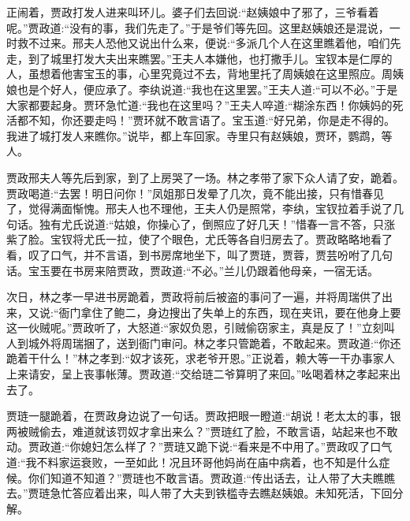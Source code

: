\begin{parag}
    正闹着，贾政打发人进来叫环儿。婆子们去回说:“赵姨娘中了邪了，三爷看着呢。”贾政道:“没有的事，我们先走了。”于是爷们等先回。这里赵姨娘还是混说，一时救不过来。邢夫人恐他又说出什么来，便说:“多派几个人在这里瞧着他，咱们先走，到了城里打发大夫出来瞧罢。”王夫人本嫌他，也打撒手儿。宝钗本是仁厚的人，虽想着他害宝玉的事，心里究竟过不去，背地里托了周姨娘在这里照应。周姨娘也是个好人，便应承了。李纨说道:“我也在这里罢。”王夫人道:“可以不必。”于是大家都要起身。贾环急忙道:“我也在这里吗？”王夫人啐道:“糊涂东西！你姨妈的死活都不知，你还要走吗！”贾环就不敢言语了。宝玉道:“好兄弟，你是走不得的。我进了城打发人来瞧你。”说毕，都上车回家。寺里只有赵姨娘，贾环，鹦鹉，等人。
\end{parag}


\begin{parag}
    贾政邢夫人等先后到家，到了上房哭了一场。林之孝带了家下众人请了安，跪着。贾政喝道:“去罢！明日问你！”凤姐那日发晕了几次，竟不能出接，只有惜春见了，觉得满面惭愧。邢夫人也不理他，王夫人仍是照常，李纨，宝钗拉着手说了几句话。独有尤氏说道:“姑娘，你操心了，倒照应了好几天！”惜春一言不答，只涨紫了脸。宝钗将尤氏一拉，使了个眼色，尤氏等各自归房去了。贾政略略地看了看，叹了口气，并不言语，到书房席地坐下，叫了贾琏，贾蓉，贾芸吩咐了几句话。宝玉要在书房来陪贾政，贾政道:“不必。”兰儿仍跟着他母亲，一宿无话。
\end{parag}


\begin{parag}
    次日，林之孝一早进书房跪着，贾政将前后被盗的事问了一遍，并将周瑞供了出来，又说:“衙门拿住了鲍二，身边搜出了失单上的东西，现在夹讯，要在他身上要这一伙贼呢。”贾政听了，大怒道:“家奴负恩，引贼偷窃家主，真是反了！”立刻叫人到城外将周瑞捆了，送到衙门审问。林之孝只管跪着，不敢起来。贾政道:“你还跪着干什么！”林之孝到:“奴才该死，求老爷开恩。”正说着，赖大等一干办事家人上来请安，呈上丧事帐薄。贾政道:“交给琏二爷算明了来回。”吆喝着林之孝起来出去了。
\end{parag}


\begin{parag}
    贾琏一腿跪着，在贾政身边说了一句话。贾政把眼一瞪道:“胡说！老太太的事，银两被贼偷去，难道就该罚奴才拿出来么？”贾琏红了脸，不敢言语，站起来也不敢动。贾政道:“你媳妇怎么样了？”贾琏又跪下说:“看来是不中用了。”贾政叹了口气道:“我不料家运衰败，一至如此！况且环哥他妈尚在庙中病着，也不知是什么症候。你们知道不知道？”贾琏也不敢言语。贾政道:“传出话去，让人带了大夫瞧瞧去。”贾琏急忙答应着出来，叫人带了大夫到铁槛寺去瞧赵姨娘。未知死活，下回分解。
\end{parag}